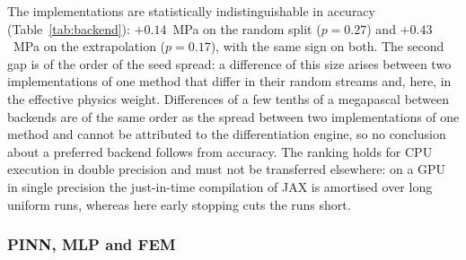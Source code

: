 \documentclass[subscriptcorrection,upint,varvw,barcolor=Goldenrod3,mathalfa=cal=euler,balance,hyphenate,french,pdf-a]{asmejour} %
\begin{document}
The implementations are statistically indistinguishable in accuracy (Table~\ref{tab:backend}): $+0.14$~MPa on the random split ($p=0.27$) and $+0.43$~MPa on the extrapolation ($p=0.17$), with the same sign on both. The second gap is of the order of the seed spread: a difference of this size arises between two implementations of one method that differ in their random streams and, here, in the effective physics weight. %
Differences of a few tenths of a megapascal between backends are of the same order as the
spread between two implementations of one method and cannot be attributed to the differentiation
engine, so no conclusion about a preferred backend follows from accuracy.
The ranking holds for CPU execution in double precision and must not be transferred elsewhere: on a GPU in single precision the just-in-time compilation of JAX is amortised over long uniform runs, whereas here early stopping cuts the runs short.

\subsubsection{PINN, MLP and FEM}
\label{sec:res_fem}
\end{document}
